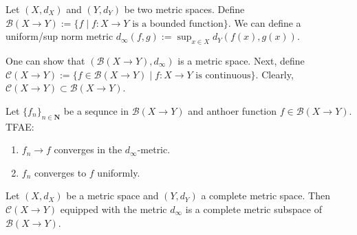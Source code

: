 \begin{definition}
Let $(X, d_X)$ and $(Y, d_Y)$ be two metric spaces. Define $\mathcal{B}(X \rightarrow Y) := \{ f \mid f: X \rightarrow Y \text{ is a bounded function} \}$. We can define a uniform/sup norm metric $d_\infty(f,g) := \displaystyle\sup_{x \in X} d_Y(f(x), g(x))$.
\end{definition}

One can show that $(\mathcal{B}(X\rightarrow Y), d_\infty)$ is a metric space.
Next, define $\mathcal{C}(X \rightarrow Y) := \{ f \in \mathcal{B}(X \rightarrow Y) \mid f: X \rightarrow Y \text{ is continuous} \}$.
Clearly, $\mathcal{C}(X \rightarrow Y)\subset \mathcal{B}(X \rightarrow Y)$.

\begin{remark}
Let $\{f_n\}_{n\in\mathbf{N}}$ be a sequnce in $\mathcal{B}(X \rightarrow Y)$ and anthoer function $f\in \mathcal{B}(X \rightarrow Y).$ TFAE:
\begin{enumerate}
    \item $f_n \rightarrow f$ converges in the $d_\infty$-metric.
    \item $f_n$ converges to $f$ uniformly.
\end{enumerate}
\end{remark}

\begin{theorem}
    Let $(X, d_X)$ be a metric space and $(Y, d_Y)$ a complete metric space. Then $\mathcal{C}(X \rightarrow Y)$ equipped with the metric $d_\infty$ is a complete metric subspace of $\mathcal{B}(X \rightarrow Y)$.
    \label{complete codomain and complete continuous function space}
\end{theorem}

